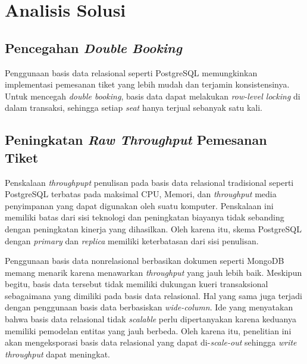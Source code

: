 \section{Analisis Solusi}

\subsection{Pencegahan \textit{Double Booking}}

Penggunaan basis data relasional seperti PostgreSQL memungkinkan implementasi pemesanan tiket yang lebih mudah dan terjamin konsistensinya. Untuk mencegah \textit{double booking}, basis data dapat melakukan \textit{row-level locking} di dalam transaksi, sehingga setiap \textit{seat} hanya terjual sebanyak satu kali.

\subsection{Peningkatan \textit{Raw Throughput} Pemesanan Tiket}

Penskalaan \textit{throughpupt} penulisan pada basis data relasional tradisional seperti PostgreSQL terbatas pada maksimal CPU, Memori, dan \textit{throughput} media penyimpanan yang dapat digunakan oleh suatu komputer. Penskalaan ini memiliki batas dari sisi teknologi dan peningkatan biayanya tidak sebanding dengan peningkatan kinerja yang dihasilkan. Oleh karena itu, skema PostgreSQL dengan \textit{primary} dan \textit{replica} memiliki keterbatasan dari sisi penulisan.

Penggunaan basis data nonrelasional berbasikan dokumen seperti MongoDB memang menarik karena menawarkan \textit{throughput} yang jauh lebih baik. Meskipun begitu, basis data tersebut tidak memiliki dukungan kueri transaksional sebagaimana yang dimiliki pada basis data relasional. Hal yang sama juga terjadi dengan penggunaan basis data berbasiskan \textit{wide-column}. Ide yang menyatakan bahwa basis data relasional tidak \textit{scalable} perlu dipertanyakan karena keduanya memiliki pemodelan entitas yang jauh berbeda. Oleh karena itu, penelitian ini akan mengeksporasi basis data relasional yang dapat di-\textit{scale-out} sehingga \textit{write throughput} dapat meningkat.

